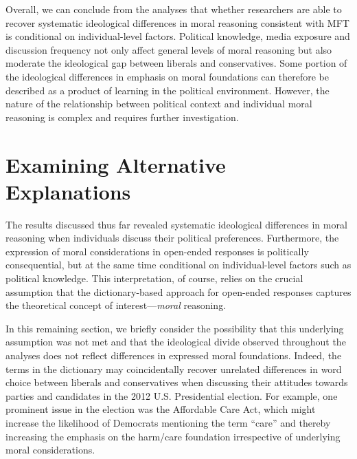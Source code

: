 \documentclass[12pt]{article}
\begin{document}
Overall, we can conclude from the analyses that whether researchers are able to recover systematic ideological differences in moral reasoning consistent with MFT is conditional on individual-level factors. Political knowledge, media exposure and discussion frequency not only affect general levels of moral reasoning but also moderate the ideological gap between liberals and conservatives. Some portion of the ideological differences in emphasis on moral foundations can therefore be described as a product of learning in the political environment. However, the nature of the relationship between political context and individual moral reasoning is complex and requires further investigation.


\section*{Examining Alternative Explanations}

The results discussed thus far revealed systematic ideological differences in moral reasoning when individuals discuss their political preferences. Furthermore, the expression of moral considerations in open-ended responses is politically consequential, but at the same time conditional on individual-level factors such as political knowledge. This interpretation, of course, relies on the crucial assumption that the dictionary-based approach for open-ended responses captures the theoretical concept of interest---\textit{moral} reasoning.

In this remaining section, we briefly consider the possibility that this underlying assumption was not met and that the ideological divide observed throughout the analyses does not reflect differences in expressed moral foundations. Indeed, the terms in the dictionary may coincidentally recover unrelated differences in word choice between liberals and conservatives when discussing their attitudes towards parties and candidates in the 2012 U.S. Presidential election. For example, one prominent issue in the election was the Affordable Care Act, which might increase the likelihood of Democrats mentioning the term ``care'' and thereby increasing the emphasis on the harm/care foundation irrespective of underlying moral considerations.
\end{document}
